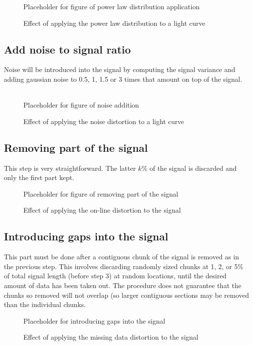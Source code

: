 		\begin{figure}
			\label{fig:powlaw_sample.eps}
			Placeholder for figure of power law distribution application
			\caption{Effect of applying the power law distribution to a light curve}
		\end{figure}
		
		\subsection{Add noise to signal ratio}
		Noise will be introduced into the signal by computing the signal variance and adding gaussian noise to 0.5, 1, 1.5 or 3 times that amount on top of the signal. \\ \\
		
		\begin{figure}
			\label{fig:noise_sample.eps}
			Placeholder for figure of noise addition
			\caption{Effect of applying the noise distortion to a light curve}
		\end{figure}
		
		\subsection{Removing part of the signal}
		This step is very straightforward. The latter $k\%$ of the signal is discarded and only the first part kept.
		
		\begin{figure}
			\label{fig:observe_sample.eps}
			Placeholder for figure of removing part of the signal
			\caption{Effect of applying the on-line distortion to the signal}
		\end{figure}
		
		\subsection{Introducing gaps into the signal}
		This part must be done after a contiguous chunk of the signal is removed as in the previous step. This involves discarding randomly sized chunks at 1, 2, or 5\% of total signal length (before step 3) at random locations, until the desired amount of data has been taken out. The procedure does not guarantee that the chunks so removed will not overlap (so larger contiguous sections may be removed than the individual chunks.  %
		
		\begin{figure}
			\label{fig:missing_sample.eps}
			Placeholder for introducing gaps into the signal
			\caption{Effect of applying the missing data distortion to the signal}
		\end{figure}
		
%
